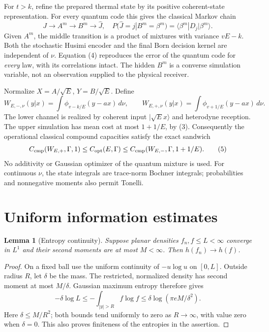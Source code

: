 \documentclass[11pt]{article}
\newtheorem{lemma}[theorem]{Lemma}
\newcommand{\capq}{C_{\mathrm{opt}}}
\begin{document}
For \(t>k\), refine the prepared thermal state by its positive
coherent-state representation. For every quantum code this gives the
classical Markov chain
\[
 J\longrightarrow A^m\longrightarrow B^m\longrightarrow\widehat J,
 \quad
 P(\widehat J=j|B^m=\beta^m)
   =\langle\beta^m|D_j|\beta^m\rangle .                       \tag{4}
\]
Given \(A^m\), the middle transition is a product of mixtures with
variance \(vE-k\). Both the stochastic Husimi encoder and the final Born
decision kernel are independent of \(\nu\). Equation (4) reproduces
the error of the quantum code for \emph{every} law, with its correlations
intact. The hidden \(B^m\) is a converse simulation variable, not an
observation supplied to the physical receiver.

Normalize \(X=A/\sqrt E\), \(Y=B/\sqrt E\). Define
\[
 W_{E,-,\nu}(y|x)=\int\phi_{v-k/E}(y-ax)\,d\nu,\qquad
 W_{E,+,\nu}(y|x)=\int\phi_{v+1/E}(y-ax)\,d\nu .
\]
The lower channel is realized by coherent input \(|\sqrt E x\rangle\)
and heterodyne reception. The upper simulation has mean cost at most
\(1+1/E\), by (3). Consequently the operational classical compound
capacities satisfy the exact sandwich
\[
 C_{\rm cmp}(W_{E,+},\Gamma,1)
 \leq \capq(E,\Gamma)
 \leq C_{\rm cmp}(W_{E,-},\Gamma,1+1/E).                     \tag{5}
\]
No additivity or Gaussian optimizer of the quantum mixture is used.
For continuous \(\nu\), the state integrals are trace-norm Bochner
integrals; probabilities and nonnegative moments also permit Tonelli.

\section{Uniform information estimates}

\begin{lemma}[Entropy continuity]\label{lem:entropy}
Suppose planar densities \(f_n,f\leq L<\infty\) converge in \(L^1\)
and their second moments are at most \(M<\infty\). Then
\(h(f_n)\to h(f)\).
\end{lemma}
\begin{proof}
On a fixed ball use the uniform continuity of \(-u\log u\) on \([0,L]\).
Outside radius \(R\), let \(\delta\) be the mass. The restricted,
normalized density has second moment at most \(M/\delta\). Gaussian
maximum entropy therefore gives
\[
 -\delta\log L\leq-\int_{|y|>R} f\log f
 \leq\delta\log(\pi eM/\delta^2).
\]
Here \(\delta\leq M/R^2\); both bounds tend uniformly to zero as
\(R\to\infty\), with value zero when \(\delta=0\).
This also proves finiteness of the entropies in the assertion.
\end{proof}
\end{document}
